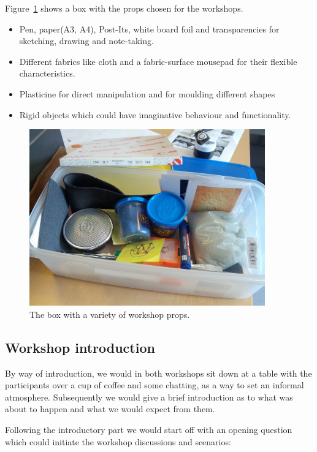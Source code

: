 Figure~\ref{ch:workshops:props-box} shows a box with the props chosen for the workshops.

\begin{itemize}
  \item{Pen, paper(A3, A4), Post-Its, white board foil and transparencies for sketching, drawing and note-taking.}
  \item{Different fabrics like cloth and a fabric-surface mousepad for their flexible characteristics.}
  \item{Plasticine for direct manipulation and for moulding different shapes}
  \item{Rigid objects which could have imaginative behaviour and functionality.}
\end{itemize}

\begin{figure}[hb]
  \centering
    \includegraphics[width=4in]{workshops/props-box}
    \caption[A box with a variety of workshop props.] %
  {The box with a variety of workshop props.} %
  \label{ch:workshops:props-box}
\end{figure}

\subsection{Workshop introduction}
\label{ch:workshops:approach:introduction}
By way of introduction, we would in both workshops sit down at a table with the participants over a cup of coffee and some chatting, as a way to set an informal atmosphere.
Subsequently we would give a brief introduction as to what was about to happen and what we would expect from them.

Following the introductory part we would start off with an opening question which could initiate the workshop discussions and scenarios:

